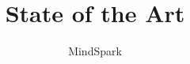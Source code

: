 \documentclass[11pt,a4paper]{report}
\begin{document}
\title{State of the Art}
\author{MindSpark}
\date{}
\maketitle
\tableofcontents



\end{document}
